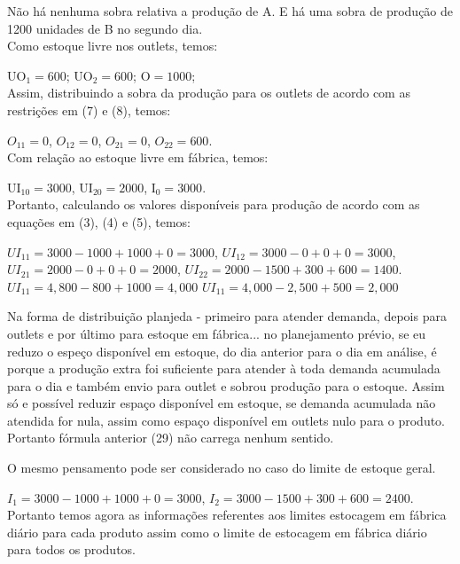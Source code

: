 \documentclass[authoryear,preprint,12pt]{elsarticle}
\begin{document}
Não há nenhuma sobra relativa a produção de A. E há uma sobra de produção de 1200 unidades de B no segundo dia. \\

Como estoque livre nos outlets, temos:

$\textrm{UO}_{1} = 600$;
$\textrm{UO}_{2} = 600$;
$\textrm{O} = 1000$; \\

Assim, distribuindo a sobra da produção para os outlets de acordo com as restrições em (7) e (8), temos:

$O_{11} = 0$,
$O_{12} = 0$,
$O_{21} = 0$,
$O_{22} = 600$. \\

Com relação ao estoque livre em fábrica, temos:

$\textrm{UI}_{10} = 3000$,
$\textrm{UI}_{20} = 2000$,
$\textrm{I}_{0} = 3000$. \\

Portanto, calculando os valores disponíveis para produção de acordo com as equações em (3), (4) e (5), temos:

$UI_{11} = 3000 - 1000 + 1000 + 0 =  3000$,
$UI_{12} = 3000 - 0 + 0 + 0 =  3000$,
$UI_{21} = 2000 - 0 + 0 + 0 =  2000$,
$UI_{22} = 2000 - 1500 + 300 + 600 =  1400$. \\


$UI_{11} = 4,800 - 800 +  1000 = 4,000$
$UI_{11} = 4,000 - 2,500 + 500 = 2,000$

Na forma de distribuição planjeda - primeiro para atender demanda, depois para outlets e por último para estoque em fábrica... 
no planejamento prévio, se eu reduzo o espeço disponível em estoque, do dia anterior para o dia em análise, é porque a produção extra foi suficiente para atender à toda demanda acumulada para o dia e também envio para outlet e sobrou produção para o estoque. Assim só e possível reduzir espaço disponível em estoque, se demanda acumulada não atendida for nula, assim como espaço disponível em outlets nulo para o produto. Portanto fórmula anterior (29) não carrega nenhum sentido.

O mesmo pensamento pode ser considerado no caso do limite de estoque geral. 

$I_{1} = 3000 - 1000 + 1000 + 0 = 3000$,
$I_{2} = 3000 - 1500 + 300 + 600 = 2400$. \\

Portanto temos agora as informações referentes aos limites estocagem em fábrica diário para cada produto assim como o limite de estocagem em fábrica diário para todos os produtos. \\
\end{document}
